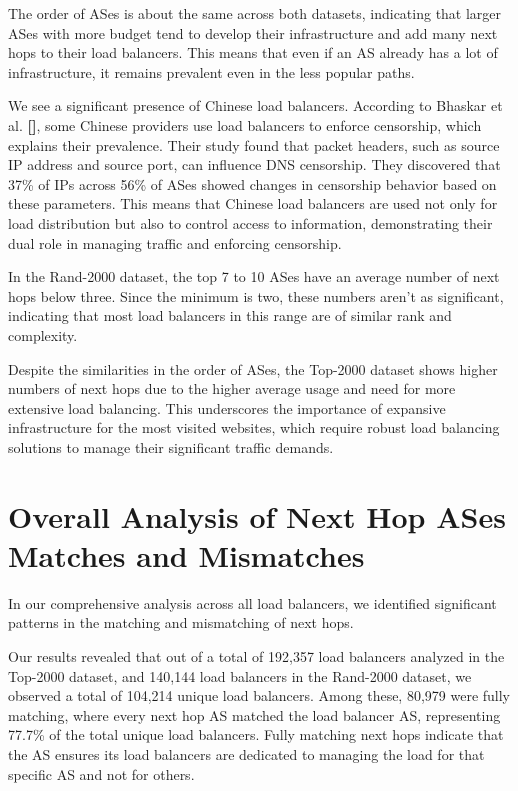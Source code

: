 \documentclass[12pt]{cwru_thesis}
\begin{document}
The order of ASes is about the same across both datasets, indicating that larger ASes with more budget tend to develop their infrastructure and add many next hops to their load balancers. This means that even if an AS already has a lot of infrastructure, it remains prevalent even in the less popular paths.

We see a significant presence of Chinese load balancers. According to Bhaskar et al. \textbf{[\cite{bhaskar2021}]}, some Chinese providers use load balancers to enforce censorship, which explains their prevalence. Their study found that packet headers, such as source IP address and source port, can influence DNS censorship. They discovered that 37\% of IPs across 56\% of ASes showed changes in censorship behavior based on these parameters. This means that Chinese load balancers are used not only for load distribution but also to control access to information, demonstrating their dual role in managing traffic and enforcing censorship.

In the Rand-2000 dataset, the top 7 to 10 ASes have an average number of next hops below three. Since the minimum is two, these numbers aren't as significant, indicating that most load balancers in this range are of similar rank and complexity.

Despite the similarities in the order of ASes, the Top-2000 dataset shows higher numbers of next hops due to the higher average usage and need for more extensive load balancing. This underscores the importance of expansive infrastructure for the most visited websites, which require robust load balancing solutions to manage their significant traffic demands.

\newpage
\section{Overall Analysis of Next Hop ASes Matches and Mismatches}

In our comprehensive analysis across all load balancers, we identified significant patterns in the matching and mismatching of next hops.

Our results revealed that out of a total of 192,357 load balancers analyzed in the Top-2000 dataset, and 140,144 load balancers in the Rand-2000 dataset, we observed a total of 104,214 unique load balancers. Among these, 80,979 were fully matching, where every next hop AS matched the load balancer AS, representing 77.7\% of the total unique load balancers. Fully matching next hops indicate that the AS ensures its load balancers are dedicated to managing the load for that specific AS and not for others.
\end{document}
